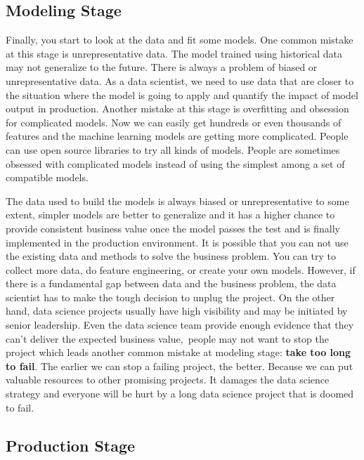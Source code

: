 \documentclass[12pt,]{krantz}
\begin{document}
\hypertarget{modeling-stage}{%
\subsection{Modeling Stage}\label{modeling-stage}}

Finally, you start to look at the data and fit some models. One common mistake at this stage is unrepresentative data. The model trained using historical data may not generalize to the future. There is always a problem of biased or unrepresentative data. As a data scientist, we need to use data that are closer to the situation where the model is going to apply and quantify the impact of model output in production. Another mistake at this stage is overfitting and obsession for complicated models. Now we can easily get hundreds or even thousands of features and the machine learning models are getting more complicated. People can use open source libraries to try all kinds of models. People are sometimes obsessed with complicated models instead of using the simplest among a set of compatible models.

The data used to build the models is always biased or unrepresentative to some extent, simpler models are better to generalize and it has a higher chance to provide consistent business value once the model passes the test and is finally implemented in the production environment. It is possible that you can not use the existing data and methods to solve the business problem. You can try to collect more data, do feature engineering, or create your own models. However, if there is a fundamental gap between data and the business problem, the data scientist has to make the tough decision to unplug the project. On the other hand, data science projects usually have high visibility and may be initiated by senior leadership. Even the data science team provide enough evidence that they can't deliver the expected business value,~people may not want to stop the project which leads another common mistake at modeling stage: \textbf{take too long to fail}. The earlier we can stop a failing project, the better. Because we can put valuable resources to other promising projects. It damages the data science strategy and everyone will be hurt by a long data science project that is doomed to fail.

\hypertarget{production-stage}{%
\subsection{Production Stage}\label{production-stage}}
\end{document}
